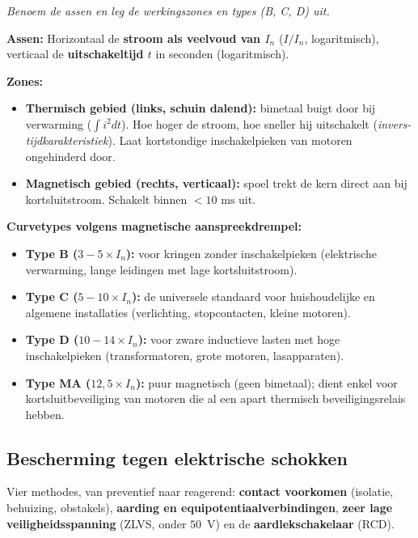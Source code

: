 \documentclass[a4paper,11pt]{article}
\begin{document}
\begin{examenbox}
    \textit{Benoem de assen en leg de werkingszones en types (B, C, D) uit.}

    \textbf{Assen:} Horizontaal de \textbf{stroom als veelvoud van $I_n$} ($I/I_n$, logaritmisch),
    verticaal de \textbf{uitschakeltijd $t$} in seconden (logaritmisch).

    \textbf{Zones:}
    \begin{itemize}
        \item \textbf{Thermisch gebied (links, schuin dalend):} bimetaal buigt door bij verwarming
              ($\int i^2 dt$). Hoe hoger de stroom, hoe sneller hij uitschakelt (\emph{invers-tijdkarakteristiek}).
              Laat kortstondige inschakelpieken van motoren ongehinderd door.
        \item \textbf{Magnetisch gebied (rechts, verticaal):} spoel trekt de kern direct aan bij
              kortsluitstroom. Schakelt binnen $<10\text{ ms}$ uit.
    \end{itemize}

    \textbf{Curvetypes volgens magnetische aanspreekdrempel:}
    \begin{itemize}
        \item \textbf{Type B ($3 - 5 \times I_n$):} voor kringen zonder inschakelpieken (elektrische
              verwarming, lange leidingen met lage kortsluitstroom).
        \item \textbf{Type C ($5 - 10 \times I_n$):} de universele standaard voor huishoudelijke en
              algemene installaties (verlichting, stopcontacten, kleine motoren).
        \item \textbf{Type D ($10 - 14 \times I_n$):} voor zware inductieve lasten met hoge
              inschakelpieken (transformatoren, grote motoren, lasapparaten).
        \item \textbf{Type MA ($12{,}5 \times I_n$):} puur magnetisch (geen bimetaal); dient enkel
              voor kortsluitbeveiliging van motoren die al een apart thermisch beveiligingsrelais hebben.
    \end{itemize}
\end{examenbox}

\subsection{Bescherming tegen elektrische schokken}

Vier methodes, van preventief naar reagerend: \textbf{contact voorkomen} (isolatie, behuizing,
obstakels), \textbf{aarding en equipotentiaalverbindingen}, \textbf{zeer lage veiligheidsspanning}
(ZLVS, onder $50$~V) en de \textbf{aardlekschakelaar} (RCD).
\end{document}
